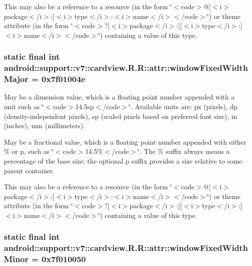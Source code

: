 This may also be a reference to a resource (in the form \char`\"{}$<$code$>$@\mbox{[}$<$i$>$package$<$/i$>$:\mbox{]}$<$i$>$type$<$/i$>$:$<$i$>$name$<$/i$>$$<$/code$>$\char`\"{}) or theme attribute (in the form \char`\"{}$<$code$>$?\mbox{[}$<$i$>$package$<$/i$>$:\mbox{]}\mbox{[}$<$i$>$type$<$/i$>$:\mbox{]}$<$i$>$name$<$/i$>$$<$/code$>$\char`\"{}) containing a value of this type. \hypertarget{classandroid_1_1support_1_1v7_1_1cardview_1_1_r_1_1attr_4858d47beb0d2665475adbb7c28bc26f}{
\subsubsection[{windowFixedWidthMajor}]{\setlength{\rightskip}{0pt plus 5cm}static final int android::support::v7::cardview.R.R::attr::windowFixedWidthMajor = 0x7f01004e}}
\label{classandroid_1_1support_1_1v7_1_1cardview_1_1_r_1_1attr_4858d47beb0d2665475adbb7c28bc26f}


May be a dimension value, which is a floating point number appended with a unit such as \char`\"{}$<$code$>$14.5sp$<$/code$>$\char`\"{}. Available units are: px (pixels), dp (density-independent pixels), sp (scaled pixels based on preferred font size), in (inches), mm (millimeters). 

May be a fractional value, which is a floating point number appended with either \% or p, such as \char`\"{}$<$code$>$14.5\%$<$/code$>$\char`\"{}. The \% suffix always means a percentage of the base size; the optional p suffix provides a size relative to some parent container. 

This may also be a reference to a resource (in the form \char`\"{}$<$code$>$@\mbox{[}$<$i$>$package$<$/i$>$:\mbox{]}$<$i$>$type$<$/i$>$:$<$i$>$name$<$/i$>$$<$/code$>$\char`\"{}) or theme attribute (in the form \char`\"{}$<$code$>$?\mbox{[}$<$i$>$package$<$/i$>$:\mbox{]}\mbox{[}$<$i$>$type$<$/i$>$:\mbox{]}$<$i$>$name$<$/i$>$$<$/code$>$\char`\"{}) containing a value of this type. \hypertarget{classandroid_1_1support_1_1v7_1_1cardview_1_1_r_1_1attr_a0530558127cced580c3396b44561412}{
\subsubsection[{windowFixedWidthMinor}]{\setlength{\rightskip}{0pt plus 5cm}static final int android::support::v7::cardview.R.R::attr::windowFixedWidthMinor = 0x7f010050}}
\label{classandroid_1_1support_1_1v7_1_1cardview_1_1_r_1_1attr_a0530558127cced580c3396b44561412}


